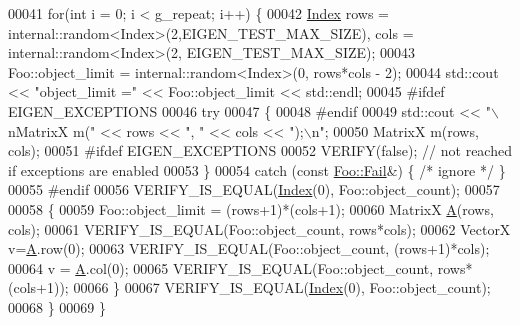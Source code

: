 \begin{DoxyCode}
00041   \textcolor{keywordflow}{for}(\textcolor{keywordtype}{int} i = 0; i < g\_repeat; i++) \{
00042     \hyperlink{namespace_eigen_a62e77e0933482dafde8fe197d9a2cfde}{Index} rows = internal::random<Index>(2,EIGEN\_TEST\_MAX\_SIZE), cols = internal::random<Index>(2,
      EIGEN\_TEST\_MAX\_SIZE);
00043     Foo::object\_limit = internal::random<Index>(0, rows*cols - 2);
00044     std::cout << \textcolor{stringliteral}{"object\_limit ="} << Foo::object\_limit << std::endl;
00045 \textcolor{preprocessor}{#ifdef EIGEN\_EXCEPTIONS}
00046     \textcolor{keywordflow}{try}
00047     \{
00048 \textcolor{preprocessor}{#endif}
00049         std::cout <<       \textcolor{stringliteral}{"\(\backslash\)nMatrixX m("} << rows << \textcolor{stringliteral}{", "} << cols << \textcolor{stringliteral}{");\(\backslash\)n"};
00050       MatrixX m(rows, cols);
00051 \textcolor{preprocessor}{#ifdef EIGEN\_EXCEPTIONS}
00052       VERIFY(\textcolor{keyword}{false});  \textcolor{comment}{// not reached if exceptions are enabled}
00053     \}
00054     \textcolor{keywordflow}{catch} (\textcolor{keyword}{const} \hyperlink{class_foo_1_1_fail}{Foo::Fail}&) \{ \textcolor{comment}{/* ignore */} \}
00055 \textcolor{preprocessor}{#endif}
00056     VERIFY\_IS\_EQUAL(\hyperlink{namespace_eigen_a62e77e0933482dafde8fe197d9a2cfde}{Index}(0), Foo::object\_count);
00057 
00058     \{
00059       Foo::object\_limit = (rows+1)*(cols+1);
00060       MatrixX \hyperlink{group___core___module_class_eigen_1_1_matrix}{A}(rows, cols);
00061       VERIFY\_IS\_EQUAL(Foo::object\_count, rows*cols);
00062       VectorX v=\hyperlink{group___core___module_class_eigen_1_1_matrix}{A}.row(0);
00063       VERIFY\_IS\_EQUAL(Foo::object\_count, (rows+1)*cols);
00064       v = \hyperlink{group___core___module_class_eigen_1_1_matrix}{A}.col(0);
00065       VERIFY\_IS\_EQUAL(Foo::object\_count, rows*(cols+1));
00066     \}
00067     VERIFY\_IS\_EQUAL(\hyperlink{namespace_eigen_a62e77e0933482dafde8fe197d9a2cfde}{Index}(0), Foo::object\_count);
00068   \}
00069 \}
\end{DoxyCode}
